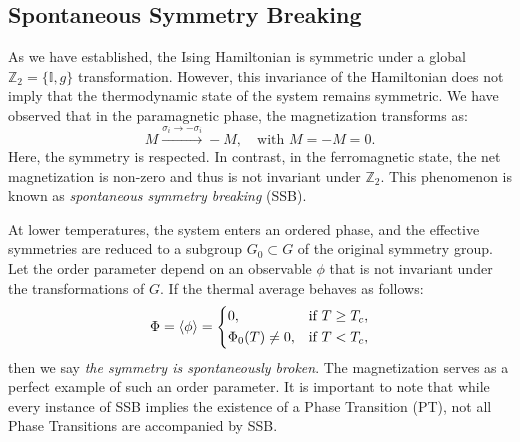 \subsection{Spontaneous Symmetry Breaking}

As we have established, the Ising Hamiltonian is symmetric under a global \(\mathbb{Z}_2 = \{\mathbb{I}, g\}\) transformation. However, this invariance of the Hamiltonian does not imply that the thermodynamic state of the system remains symmetric. We have observed that in the paramagnetic phase, the magnetization transforms as:
\[
    M \xrightarrow{\sigma_i \to -\sigma_i} -M, \quad \text{with } M=-M=0.
\]
Here, the symmetry is respected. In contrast, in the ferromagnetic state, the net magnetization is non-zero and thus is not invariant under \(\mathbb{Z}_2\). This phenomenon is known as \textit{spontaneous symmetry breaking} (SSB).

At lower temperatures, the system enters an ordered phase, and the effective symmetries are reduced to a subgroup \(G_0 \subset G\) of the original symmetry group. Let the order parameter depend on an observable \(\phi\) that is not invariant under the transformations of \(G\). If the thermal average behaves as follows:
\[
    \Phi = \langle \phi \rangle =
    \begin{dcases}
        0,                & \text{if } T \geq T_c, \\
        \Phi_0(T) \neq 0, & \text{if } T < T_c,
    \end{dcases}
\]
then we say \textit{the symmetry is spontaneously broken}. The magnetization serves as a perfect example of such an order parameter. It is important to note that while every instance of SSB implies the existence of a Phase Transition (PT), not all Phase Transitions are accompanied by SSB.

